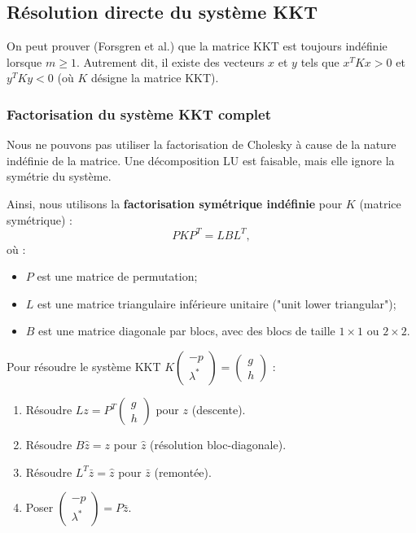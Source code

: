 \subsection{Résolution directe du système KKT}

\begin{remarque}
    On peut prouver (Forsgren et al.) que la matrice KKT est toujours indéfinie lorsque $m \ge 1$. Autrement dit, il existe des vecteurs $x$ et $y$ tels que $x^T K x > 0$ et $y^T K y < 0$ (où $K$ désigne la matrice KKT).
\end{remarque}

\subsubsection{Factorisation du système KKT complet}

Nous ne pouvons pas utiliser la factorisation de Cholesky à cause de la nature indéfinie de la matrice.
Une décomposition LU est faisable, mais elle ignore la symétrie du système.

Ainsi, nous utilisons la \textbf{factorisation symétrique indéfinie} pour $K$ (matrice symétrique) :
\begin{equation}
    P K P^T = L B L^T,
\end{equation}
où :
\begin{itemize}
    \item $P$ est une matrice de permutation;
    \item $L$ est une matrice triangulaire inférieure unitaire ("unit lower triangular");
    \item $B$ est une matrice diagonale par blocs, avec des blocs de taille $1 \times 1$ ou $2 \times 2$.
\end{itemize}

Pour résoudre le système KKT $K \begin{pmatrix} -p \\ \lambda^* \end{pmatrix} = \begin{pmatrix} g \\ h \end{pmatrix}$ :
\begin{enumerate}
    \item Résoudre $Lz = P^T \begin{pmatrix} g \\ h \end{pmatrix}$ pour $z$ (descente).
    \item Résoudre $B\hat{z} = z$ pour $\hat{z}$ (résolution bloc-diagonale).
    \item Résoudre $L^T \bar{z} = \hat{z}$ pour $\bar{z}$ (remontée).
    \item Poser $\begin{pmatrix} -p \\ \lambda^* \end{pmatrix} = P \bar{z}$.
\end{enumerate}

